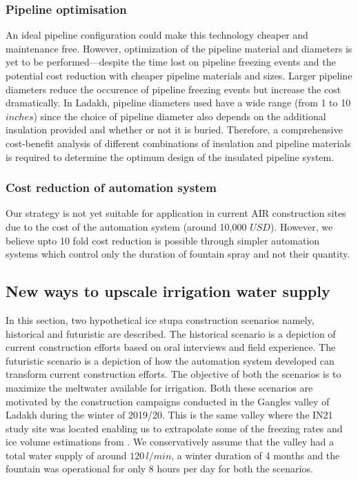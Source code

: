 \documentclass[tc, manuscript]{copernicus}
\begin{document}
\subsubsection{Pipeline optimisation}

An ideal pipeline configuration could make this technology cheaper and maintenance free. However, optimization
of the pipeline material and diameters is yet to be performed---despite the time lost on pipeline freezing
events and the potential cost reduction with cheaper pipeline materials and sizes. Larger pipeline diameters
reduce the occurence of pipeline freezing events but increase the cost dramatically. In Ladakh, pipeline
diameters used have a wide range (from 1 to 10 $inches$) since the choice of pipeline diameter also depends on
the additional insulation provided and whether or not it is buried. Therefore, a comprehensive cost-benefit
analysis of different combinations of insulation and pipeline materials is required to determine the optimum
design of the insulated pipeline system.  

\subsubsection{Cost reduction of automation system}

Our strategy is not yet suitable for application in current AIR construction sites due to the cost of the
automation system (around 10,000 $USD$). However, we believe upto 10 fold cost reduction is possible through
simpler automation systems which control only the duration of fountain spray and not their quantity. 

\subsection{New ways to upscale irrigation water supply}

In this section, two hypothetical ice stupa construction scenarios namely, historical and futuristic are
described. The historical scenario is a depiction of current construction efforts based on oral interviews and
field experience. The futuristic scenario is a depiction of how the automation system developed can transform
current construction efforts. The objective of both the scenarios is to maximize the meltwater available for
irrigation. Both these scenarios are motivated by the construction campaigns conducted in the Gangles valley of
Ladakh during the winter of 2019/20. This is the same valley where the IN21 study site was located enabling us
to extrapolate some of the freezing rates and ice volume estimations from
\citet{balasubramanianInfluenceMeteorologicalConditions2022}. We conservatively assume that the valley had a
total water supply of around $120\,l/min$, a winter duration of 4 months and the fountain was operational for
only 8 hours per day for both the scenarios. 
\end{document}
